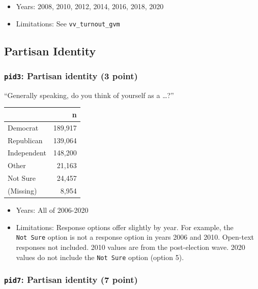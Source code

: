 \documentclass[10pt,article,oneside]{memoir}
\theoremstyle{definition}
\begin{document}
\begin{itemize}
\tightlist
\item
  Years: 2008, 2010, 2012, 2014, 2016, 2018, 2020
\item
  Limitations: See \texttt{vv\_turnout\_gvm}
\end{itemize}

\newpage

\hypertarget{partisan-identity}{%
\subsection{Partisan Identity}\label{partisan-identity}}

\hypertarget{pid3-partisan-identity-3-point}{%
\subsubsection{\texorpdfstring{\texttt{pid3}: Partisan identity (3
point)}{pid3: Partisan identity (3 point)}}\label{pid3-partisan-identity-3-point}}

``Generally speaking, do you think of yourself as a \ldots?''

\begin{table}[H]
\centering
\begin{tabular}{lr}
\toprule
 & n\\
\midrule
Democrat & 189,917\\
Republican & 139,064\\
Independent & 148,200\\
Other & 21,163\\
Not Sure & 24,457\\
(Missing) & 8,954\\
\bottomrule
\end{tabular}
\end{table}

\begin{itemize}
\tightlist
\item
  Years: All of 2006-2020
\item
  Limitations: Response options offer slightly by year. For example, the
  \texttt{Not\ Sure} option is not a response option in years 2006 and
  2010. Open-text responses not included. 2010 values are from the
  post-election wave. 2020 values do not include the \texttt{Not\ Sure}
  option (option 5).
\end{itemize}

\hypertarget{pid7-partisan-identity-7-point}{%
\subsubsection{\texorpdfstring{\texttt{pid7}: Partisan identity (7
point)}{pid7: Partisan identity (7 point)}}\label{pid7-partisan-identity-7-point}}
\end{document}
